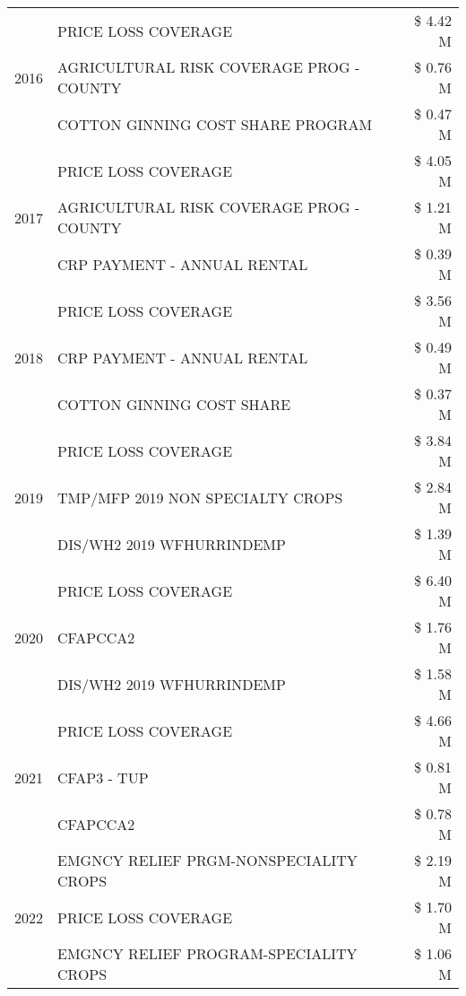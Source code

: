 \begin{tabular}{llr}
\cline{1-3}
\multirow[t]{3}{*}{2016} & PRICE LOSS COVERAGE & \$ 4.42 M \\
 & AGRICULTURAL RISK COVERAGE PROG - COUNTY & \$ 0.76 M \\
 & COTTON GINNING COST SHARE PROGRAM & \$ 0.47 M \\
\cline{1-3}
\multirow[t]{3}{*}{2017} & PRICE LOSS COVERAGE & \$ 4.05 M \\
 & AGRICULTURAL RISK COVERAGE PROG - COUNTY & \$ 1.21 M \\
 & CRP PAYMENT - ANNUAL RENTAL & \$ 0.39 M \\
\cline{1-3}
\multirow[t]{3}{*}{2018} & PRICE LOSS COVERAGE & \$ 3.56 M \\
 & CRP PAYMENT - ANNUAL RENTAL & \$ 0.49 M \\
 & COTTON GINNING COST SHARE & \$ 0.37 M \\
\cline{1-3}
\multirow[t]{3}{*}{2019} & PRICE LOSS COVERAGE & \$ 3.84 M \\
 & TMP/MFP 2019 NON SPECIALTY CROPS & \$ 2.84 M \\
 & DIS/WH2 2019 WFHURRINDEMP & \$ 1.39 M \\
\cline{1-3}
\multirow[t]{3}{*}{2020} & PRICE LOSS COVERAGE & \$ 6.40 M \\
 & CFAPCCA2 & \$ 1.76 M \\
 & DIS/WH2 2019 WFHURRINDEMP & \$ 1.58 M \\
\cline{1-3}
\multirow[t]{3}{*}{2021} & PRICE LOSS COVERAGE & \$ 4.66 M \\
 & CFAP3 - TUP & \$ 0.81 M \\
 & CFAPCCA2 & \$ 0.78 M \\
\cline{1-3}
\multirow[t]{3}{*}{2022} & EMGNCY RELIEF PRGM-NONSPECIALITY CROPS & \$ 2.19 M \\
 & PRICE LOSS COVERAGE & \$ 1.70 M \\
 & EMGNCY RELIEF PROGRAM-SPECIALITY CROPS & \$ 1.06 M \\
\cline{1-3}
\bottomrule
\end{tabular}
